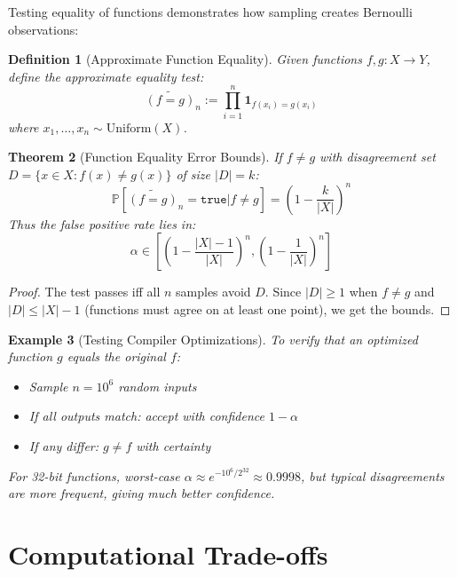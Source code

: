 \documentclass[11pt,final,hidelinks]{article}
\newtheorem{theorem}{Theorem}[section]
\newtheorem{definition}[theorem]{Definition}
\newtheorem{example}[theorem]{Example}
\newcommand{\obs}[1]{\widetilde{#1}}  %
\newcommand{\Prob}[1]{\mathbb{P}\left[#1\right]}
\newcommand{\True}{\mathtt{true}}
\begin{document}
Testing equality of functions demonstrates how sampling creates Bernoulli observations:

\begin{definition}[Approximate Function Equality]
Given functions $f, g: X \to Y$, define the approximate equality test:
\begin{equation}
\obs{(f = g)}_n := \prod_{i=1}^n \mathbf{1}_{f(x_i) = g(x_i)}
\end{equation}
where $x_1, \ldots, x_n \sim \text{Uniform}(X)$.
\end{definition}

\begin{theorem}[Function Equality Error Bounds]
If $f \neq g$ with disagreement set $D = \{x \in X : f(x) \neq g(x)\}$ of size $|D| = k$:
\begin{equation}
\Prob{\obs{(f = g)}_n = \True | f \neq g} = \left(1 - \frac{k}{|X|}\right)^n
\end{equation}
Thus the false positive rate lies in:
\begin{equation}
\alpha \in \left[\left(1 - \frac{|X|-1}{|X|}\right)^n, \left(1 - \frac{1}{|X|}\right)^n\right]
\end{equation}
\end{theorem}

\begin{proof}
The test passes iff all $n$ samples avoid $D$. Since $|D| \geq 1$ when $f \neq g$ and $|D| \leq |X|-1$ (functions must agree on at least one point), we get the bounds.
\end{proof}

\begin{example}[Testing Compiler Optimizations]
To verify that an optimized function $g$ equals the original $f$:
\begin{itemize}
    \item Sample $n = 10^6$ random inputs
    \item If all outputs match: accept with confidence $1 - \alpha$
    \item If any differ: $g \neq f$ with certainty
\end{itemize}
For 32-bit functions, worst-case $\alpha \approx e^{-10^6/2^{32}} \approx 0.9998$, but typical disagreements are more frequent, giving much better confidence.
\end{example}

\section{Computational Trade-offs}
\end{document}
